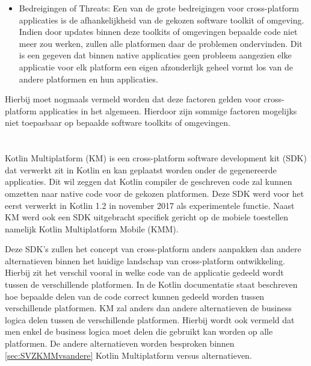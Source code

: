 \begin{itemize}
    \item Bedreigingen of Threats:
    Een van de grote bedreigingen voor cross-platform applicaties is de afhankelijkheid van de gekozen software toolkit of omgeving. Indien door updates binnen deze toolkits of omgevingen bepaalde code niet meer zou werken, zullen alle platformen daar de problemen ondervinden. Dit is een gegeven dat binnen native applicaties geen probleem aangezien elke applicatie voor elk platform een eigen afzonderlijk geheel vormt los van de andere platformen en hun applicaties. 
\end{itemize}

Hierbij moet nogmaals vermeld worden dat deze factoren gelden voor cross-platform applicaties in het algemeen. Hierdoor zijn sommige factoren mogelijks niet toepasbaar op bepaalde software toolkits of omgevingen. 



\section{}
\label{sec:SVZKM}

Kotlin Multiplatform (KM) is een cross-platform software development kit (SDK) dat verwerkt zit in Kotlin en kan geplaatst worden onder de gegenereerde applicaties. Dit wil zeggen dat Kotlin compiler de geschreven code zal kunnen omzetten naar native code voor de gekozen platformen.\autocite{Evert2019} Deze SDK werd voor het eerst verwerkt in Kotlin 1.2 in november 2017 als experimentele functie.\autocite{Jemerov2017} Naast KM werd ook een SDK uitgebracht specifiek gericht op de mobiele toestellen namelijk Kotlin Multiplatform Mobile (KMM). 

Deze SDK's zullen het concept van cross-platform anders aanpakken dan andere alternatieven binnen het huidige landschap van cross-platform ontwikkeling. Hierbij zit het verschil vooral in welke code van de applicatie gedeeld wordt tussen de verschillende platformen. In de Kotlin documentatie staat beschreven hoe bepaalde delen van de code correct kunnen gedeeld worden tussen verschillende platformen. KM zal anders dan andere alternatieven de business logica delen tussen de verschillende platformen.\autocite{Kotlin2021} Hierbij wordt ook vermeld dat men enkel de business logica moet delen die gebruikt kan worden op alle platformen. De andere alternatieven worden besproken binnen \ref{sec:SVZKMMvsandere} Kotlin Multiplatform versus alternatieven.

